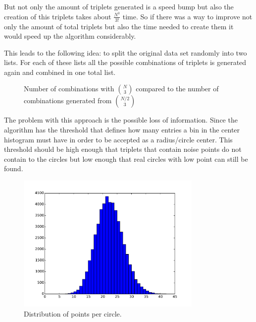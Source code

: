 \documentclass[11pt,twoside]{scrreprt}
\begin{document}
But not only the amount of triplets generated is a speed bump but also the creation of this triplets takes about $\frac{N^3}{3!}$ time. So if there was a way to improve not only the amount of total triplets but also the time needed
to create them it would speed up the algorithm considerably.

This leads to the following idea: to split the original data set randomly into two lists. For each of these lists all the possible combinations of triplets is generated again and combined in one total list.

\begin{figure}[b]
\centering
  \caption{Number of combinations with $\binom{N}{3}$ compared to the number of combinations generated from $\binom{N/2}{3}$}
  \label{fig:binom_half_growth}
\end{figure}

The problem with this approach is the possible loss of information. Since the
algorithm has the threshold that defines how many entries a bin in the 
center histogram must have in order to be accepted as a radius/circle center.
This threshold should be high enough that triplets that contain noise points
do not contain to the circles but low enough that real circles with low point
can still be found.
\begin{figure}[tb]
   \centering
   \includegraphics[width=0.8\textwidth]{pics/ppc}
   \caption{Distribution of points per circle. }
   \label{fig:ppc}
 \end{figure} 
\end{document}
